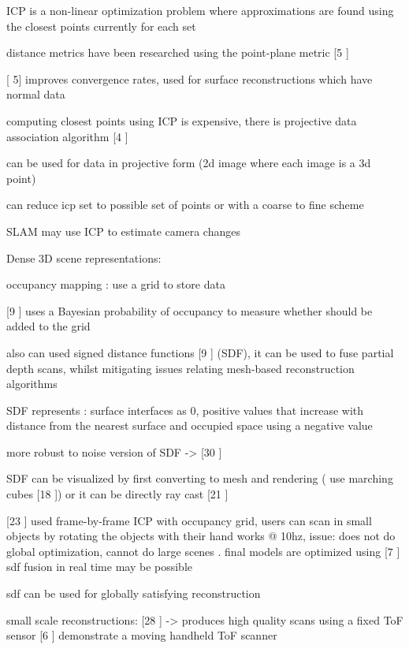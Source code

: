 ICP is a non-linear optimization problem where approximations are found using the closest points currently for each
set

distance metrics have been researched using the point-plane metric [5 \cite{Chen92Object}]

[\cite{Chen92Object} 5] improves convergence rates, used for surface reconstructions which have normal data

computing closest points using ICP is expensive, there is projective data association algorithm [4 \cite{Blais95Registering}]

can be used for data in projective form (2d image where each image is a 3d point)

can reduce icp set to possible set of points or with a coarse to fine scheme

SLAM may use ICP to estimate camera changes

Dense 3D scene representations:

occupancy mapping : use a grid to store data

[9 \cite{Elfes87Sensor}] uses a Bayesian probability of occupancy to measure whether should be added to the grid

also can used signed distance functions [9 \cite{Elfes87Sensor}] (SDF), it can be used to fuse partial depth scans, whilst mitigating
issues relating mesh-based reconstruction algorithms

SDF represents : surface interfaces as 0, positive values that increase with distance from the nearest surface
and occupied space using a negative value

more robust to noise version of SDF -> [30 \cite{Zach07Globally} ]

SDF can be visualized by first converting to mesh and rendering ( use marching cubes [18 \cite{Cubes87High}]) or it can be directly ray cast [21 \cite{Parker98Interactive}]

[23 \cite{Rusinkiewicz02Real}] used frame-by-frame ICP with occupancy grid, users can scan in small objects by rotating the objects with their hand
works @ 10hz, issue: does not do global optimization, cannot do large scenes . final models are optimized using [7 \cite{Curless96Volumetric}]
sdf fusion in real time may be possible

sdf can be used for globally satisfying reconstruction

small scale reconstructions:
	[28 \cite{Weise09Hand}] -> produces high quality scans using a fixed ToF sensor
	[6 \cite{Cui103d} ] demonstrate a moving handheld ToF scanner

